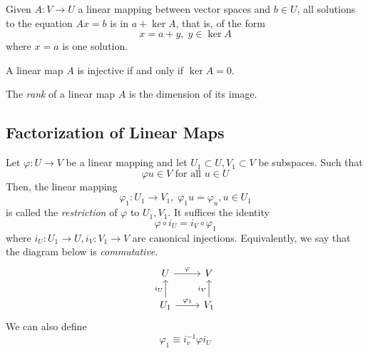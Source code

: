 \documentclass{article}
\begin{document}
  \begin{theorem}
    Given $A: V \longrightarrow U$ a linear mapping between vector spaces and $b \in U$, all solutions to the equation $Ax = b$ is in $a + \ker A$, that is, of the form 
    \begin{equation}
      x = a + y, \; y \in \ker A
    \end{equation}
    where $x = a$ is one solution. 
  \end{theorem}

  \begin{corollary}
    A linear map $A$ is injective if and only if $\ker A = 0$.
  \end{corollary}

  \begin{definition}
    The \textit{rank} of a linear map $A$ is the dimension of its image. 
  \end{definition}

  \subsection{Factorization of Linear Maps}

    \begin{definition}
      Let $\varphi: U \longrightarrow V$ be a linear mapping and let $U_1 \subset U, V_1 \subset V$ be subspaces. Such that 
      \begin{equation}
        \varphi u \in V \text{ for all } u \in U
      \end{equation}
      Then, the linear mapping 
      \begin{equation}
        \varphi_1: U_1 \longrightarrow V_1, \; \varphi_1 u = \varphi_u, u \in U_1
      \end{equation}
      is called the \textit{restriction} of $\varphi$ to $U_1, V_1$. It suffices the identity
      \begin{equation}
        \varphi \circ i_U = i_V \circ \varphi_1
      \end{equation}
      where $i_U: U_1 \longrightarrow U, i_V: V_1 \longrightarrow V$ are canonical injections. Equivalently, we say that the diagram below is \textit{commutative}. 
      \[
        \begin{tikzcd}
          U \arrow{r}{\varphi} & V \\
          U_1 \arrow{u}{i_U} \arrow{r}{\varphi_1} & V_1 \arrow{u}{i_V}
        \end{tikzcd}
      \]
      We can also define 
      \begin{equation}
        \varphi_1 \equiv i_v^{-1} \varphi i_U
      \end{equation}
    \end{definition}
\end{document}
